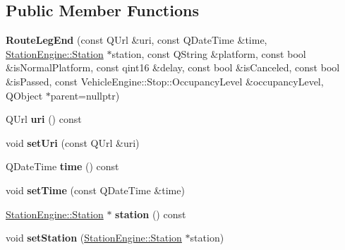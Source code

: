 \subsection*{Public Member Functions}
\begin{DoxyCompactItemize}
\item 
\mbox{\label{classRouterEngine_1_1RouteLegEnd_ac8d5c3ffe9d65a83cae8c7de5962e818}} 
{\bfseries Route\+Leg\+End} (const Q\+Url \&uri, const Q\+Date\+Time \&time, \mbox{\hyperlink{classStationEngine_1_1Station}{Station\+Engine\+::\+Station}} $\ast$station, const Q\+String \&platform, const bool \&is\+Normal\+Platform, const qint16 \&delay, const bool \&is\+Canceled, const bool \&is\+Passed, const Vehicle\+Engine\+::\+Stop\+::\+Occupancy\+Level \&occupancy\+Level, Q\+Object $\ast$parent=nullptr)
\item 
\mbox{\label{classRouterEngine_1_1RouteLegEnd_a5a6b2f91b5503c7dfb410e1e426ed721}} 
Q\+Url {\bfseries uri} () const
\item 
\mbox{\label{classRouterEngine_1_1RouteLegEnd_aaa056987791da9ae776100926dd8141f}} 
void {\bfseries set\+Uri} (const Q\+Url \&uri)
\item 
\mbox{\label{classRouterEngine_1_1RouteLegEnd_aa3050fc8b747490c3c06f7e451e9dba1}} 
Q\+Date\+Time {\bfseries time} () const
\item 
\mbox{\label{classRouterEngine_1_1RouteLegEnd_ae56d26ce44fa8261ca43834cbdd79a7d}} 
void {\bfseries set\+Time} (const Q\+Date\+Time \&time)
\item 
\mbox{\label{classRouterEngine_1_1RouteLegEnd_ac79a006d8c9d4cbcd97567beec83784a}} 
\mbox{\hyperlink{classStationEngine_1_1Station}{Station\+Engine\+::\+Station}} $\ast$ {\bfseries station} () const
\item 
\mbox{\label{classRouterEngine_1_1RouteLegEnd_a49fb362e35a88711cc794c95d8c94c4e}} 
void {\bfseries set\+Station} (\mbox{\hyperlink{classStationEngine_1_1Station}{Station\+Engine\+::\+Station}} $\ast$station)
\item 

\end{DoxyCompactItemize}
